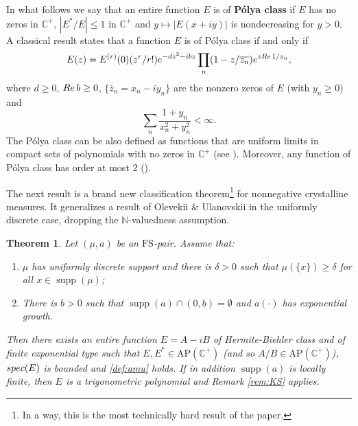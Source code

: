 \documentclass[a4paper,reqno,12pt]{amsart}
\DeclareMathOperator{\supp}{\mathrm{supp}}
\newtheorem{theorem}{Theorem}
\renewcommand{\H}{\mathbb{C}^+}
\newcommand{\n}{\mathbb{N}}
\newcommand{\re}{{\rm Re}\,}
\newcommand{\1}{{\bf 1}}
\newcommand{\apc}{\mathrm{AP}(\H)}
\newcommand{\fs}{\mathrm{FS}}
\renewcommand{\emph}[1]{{\bf #1}}
\newcommand{\ov}[1]{\overline{#1}}
\renewcommand{\1}{{\bo 1}}
\newcommand{\spec}{{\rm spec}}
\renewcommand{\a}{a(\cdot)}
\begin{document}
In what follows we say that an entire function $E$ is of \emph{P\'olya class} if $E$ has no zeros in $\H$, $|E^*/E|\leq 1$ in $\H$ and $y\mapsto |E(x+iy)|$ is nondecreasing for $y>0$. A classical result \cite[Thm. 7]{dB} states that a function $E$ is of P\'olya class if and only if
\begin{align}\label{eq:poylafact}
E(z) = E^{(r)}(0)(z^r/r!)e^{-dz^2-ibz} \prod_{n} (1-z/\ov{z_n})e^{z\re 1/z_n},
\end{align}
where $d\geq 0$, $\re b\geq 0$, $\{\ov z_n=x_n-iy_n\}$ are the nonzero zeros of $E$ (with $y_n\geq 0$) and
$$
\sum_{n} \frac{1+y_n}{x_n^2+y_n^2}<\infty.
$$ 
The P\'olya class can be also defined as functions that are uniform limits in compact sets of polynomials with no zeros in $\H$ (see \cite[Problem 12]{dB}). Moreover, any function of P\'olya class has order at most $2$ (\cite[Problem 10]{dB}). 


The next result is a brand new classification theorem\footnote{In a way, this is the most technically hard result of the paper.} for nonnegative crystalline measures. It generalizes a result of Olevekii \& Ulanovskii \cite{OU} in the uniformly discrete case, dropping the $\n$-valuedness assumption.

\begin{theorem}\label{thm:5}
Let $(\mu,a)$ be an $\fs$-pair. Assume that:
\begin{enumerate}
\item $\mu$ has uniformly discrete support and there is $\delta>0$ such that $\mu(\{x\})\geq \delta$ for all $x\in \supp(\mu)$;
\item There is $b>0$ such that $\supp(a)\cap (0,b)=\emptyset$ and $\a$ has exponential growth.
\end{enumerate}
Then there exists an entire function $E=A-iB$ of Hermite-Biehler class and of finite exponential type such that $E,E^*\in \apc$ (and so $A/B\in \apc$), $\spec(E)$ is bounded and \eqref{def:amu} holds. If in addition $\supp(a)$ is locally finite, then $E$ is a trigonometric polynomial and Remark \ref{rem:KS} applies.
\end{theorem}
\end{document}
